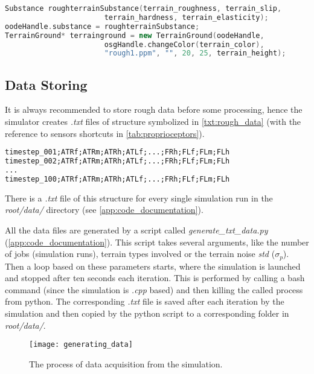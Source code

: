 \begin{lstlisting}[language=C++, caption={Setting a terrain ground in main.cpp}, label=code:terrain_ground]
Substance roughterrainSubstance(terrain_roughness, terrain_slip,
                       terrain_hardness, terrain_elasticity);
oodeHandle.substance = roughterrainSubstance;
TerrainGround* terrainground = new TerrainGround(oodeHandle, 
                       osgHandle.changeColor(terrain_color),
                       "rough1.ppm", "", 20, 25, terrain_height);
\end{lstlisting}

\newpage
\subsection*{Data Storing} \label{ssec:app:data_storing}
It is always recommended to store rough data before some processing, hence the simulator creates \textit{.txt} files of structure symbolized in \cref{txt:rough_data} (with the reference to sensors shortcuts in \cref{tab:proprioceptors}). 

\begin{lstlisting}[language=XML, caption={Rough sensory data files structure}, label=txt:rough_data]
timestep_001;ATRf;ATRm;ATRh;ATLf;...;FRh;FLf;FLm;FLh
timestep_002;ATRf;ATRm;ATRh;ATLf;...;FRh;FLf;FLm;FLh
...
timestep_100;ATRf;ATRm;ATRh;ATLf;...;FRh;FLf;FLm;FLh
\end{lstlisting}

There is a \textit{.txt} file of this structure for every single simulation run in the \textit{root/data/} directory (see \cref{app:code_documentation}).

All the data files are generated by a script called \textit{generate\_txt\_data.py} (\ref{app:code_documentation}). This script takes several arguments, like the number of jobs (simulation runs), terrain types involved or the terrain noise \textit{std} ($ \sigma_p $). Then a loop based on these parameters starts, where the simulation is launched and stopped after ten seconds each iteration. This is performed by calling a bash command (since the simulation is \textit{.cpp} based) and then killing the called process from python. The corresponding \textit{.txt} file is saved after each iteration by the simulation and then copied by the python script to a corresponding folder in \textit{root/data/}.

\begin{figure}[H]
  \centering
  \texttt{[image: generating\_data]}
  \caption{The process of data acquisition from the simulation.}
  \label{img:generating_data}
\end{figure}

